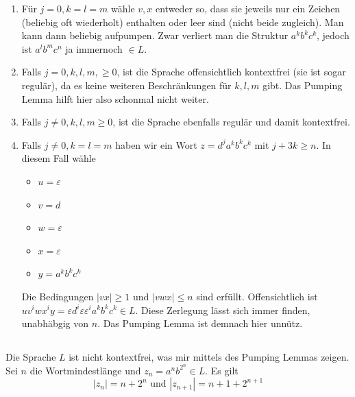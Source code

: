 \documentclass{article}
\begin{document}
\let\oldlabelenumi\labelenumi
\renewcommand{\labelenumi}{\textbf{Fall \arabic*:}}
\begin{enumerate}[leftmargin=*]
   \item Für $j = 0, k=l=m$ wähle $v,x$ entweder so, dass sie jeweils nur ein
      Zeichen (beliebig oft wiederholt) enthalten oder leer sind (nicht beide
      zugleich). Man kann dann beliebig aufpumpen. Zwar verliert man die
      Struktur $a^kb^kc^k$, jedoch ist $a^lb^mc^n$ ja immernoch $\in L$.
   \item 
      Falls $j=0,k,l,m, \ge 0$, ist die Sprache offensichtlich kontextfrei (sie
      ist sogar regulär), da es keine weiteren Beschränkungen für $k,l,m$ gibt. Das
      Pumping Lemma hilft hier also schonmal nicht weiter.
   \item Falls $j \neq 0, k, l, m \ge 0$, ist die Sprache ebenfalls regulär und
      damit kontextfrei.
   \item
      Falls $j \neq 0, k = l = m$ haben wir ein Wort $z =
      d^ja^kb^kc^k$ mit $j+3k\ge n$. In diesem Fall wähle
      \begin{itemize}
         \item $u=\varepsilon$
         \item $v = d$
         \item $w=\varepsilon$
         \item $x=\varepsilon$
         \item $y=a^kb^kc^k$
      \end{itemize}
      Die Bedingungen $|vx|\ge 1$ und $|vwx| \le n$ sind erfüllt.
      Offensichtlich ist $uv^iwx^iy = \varepsilon d^i\varepsilon
      \varepsilon^ia^kb^kc^k \in L$. Diese Zerlegung lässt sich immer finden,
      unabhäbgig von $n$. Das Pumping Lemma ist demnach hier unnütz.

\end{enumerate}

\subsection{} 

Die Sprache $L$ ist nicht kontextfrei, was mir mittels des Pumping Lemmas
zeigen. Sei $n$ die Wortmindestlänge und $z_n = a^nb^{2^n} \in L$. Es gilt
\begin{equation*}
   |z_n| = n + 2^n \text{ und } |z_{n+1}| = n + 1 + 2^{n+1}
\end{equation*}
\end{document}
